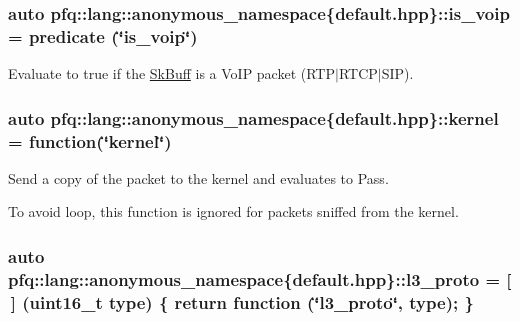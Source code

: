 \subsubsection[{\texorpdfstring{is\+\_\+voip}{is_voip}}]{\setlength{\rightskip}{0pt plus 5cm}auto pfq\+::lang\+::anonymous\+\_\+namespace\{default.\+hpp\}\+::is\+\_\+voip = {\bf predicate} (\char`\"{}is\+\_\+voip\char`\"{})}\hypertarget{namespacepfq_1_1lang_1_1anonymous__namespace_02default_8hpp_03_a79aa9beec811d735d03b40f85b4773c5}{}\label{namespacepfq_1_1lang_1_1anonymous__namespace_02default_8hpp_03_a79aa9beec811d735d03b40f85b4773c5}


Evaluate to {\ttfamily true} if the \hyperlink{structpfq_1_1lang_1_1SkBuff}{Sk\+Buff} is a Vo\+IP packet (R\+T\+P$\vert$\+R\+T\+C\+P$\vert$\+S\+IP). 

\subsubsection[{\texorpdfstring{kernel}{kernel}}]{\setlength{\rightskip}{0pt plus 5cm}auto pfq\+::lang\+::anonymous\+\_\+namespace\{default.\+hpp\}\+::kernel = {\bf function}(\char`\"{}kernel\char`\"{})}\hypertarget{namespacepfq_1_1lang_1_1anonymous__namespace_02default_8hpp_03_a93294225145f96c6aa6cf0cedfa19103}{}\label{namespacepfq_1_1lang_1_1anonymous__namespace_02default_8hpp_03_a93294225145f96c6aa6cf0cedfa19103}


Send a copy of the packet to the kernel and evaluates to {\ttfamily Pass}. 

To avoid loop, this function is ignored for packets sniffed from the kernel. 
\subsubsection[{\texorpdfstring{l3\+\_\+proto}{l3_proto}}]{\setlength{\rightskip}{0pt plus 5cm}auto pfq\+::lang\+::anonymous\+\_\+namespace\{default.\+hpp\}\+::l3\+\_\+proto = \mbox{[}$\,$\mbox{]} (uint16\+\_\+t type) \{ return {\bf function} (\char`\"{}l3\+\_\+proto\char`\"{}, type); \}}\hypertarget{namespacepfq_1_1lang_1_1anonymous__namespace_02default_8hpp_03_a1515f230673119530cd04f213627976f}{}\label{namespacepfq_1_1lang_1_1anonymous__namespace_02default_8hpp_03_a1515f230673119530cd04f213627976f}


